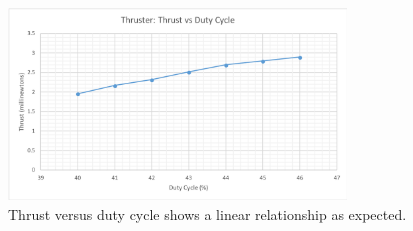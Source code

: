 \documentclass[11pt]{article}
\begin{document}
\begin{figure}[h!]
\centering
\includegraphics[width = 0.8\textwidth]{thruster_g2}
\caption{\label{fig:thruster_g2} Thrust versus duty cycle shows a linear relationship as expected.}
\end{figure}
\end{document}
